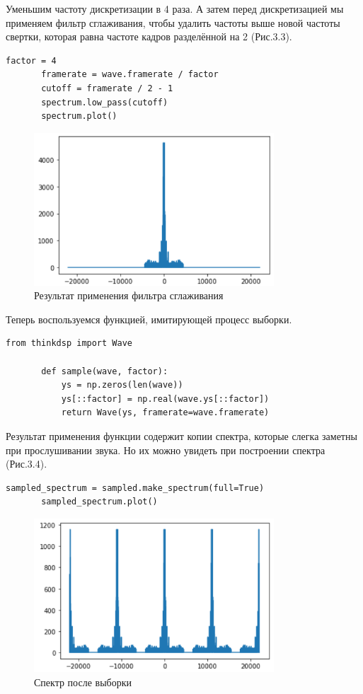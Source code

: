 \documentclass[a4paper,12pt]{report}
\begin{document}
    Уменьшим частоту дискретизации в 4 раза. А затем перед дискретизацией мы применяем фильтр сглаживания, чтобы удалить частоты выше новой частоты свертки, которая равна частоте кадров разделённой на 2 (Рис.3.3).
\begin{lstlisting}[caption=Применение фильтра сглаживания]
       factor = 4
       framerate = wave.framerate / factor
       cutoff = framerate / 2 - 1
       spectrum.low_pass(cutoff)
       spectrum.plot()
\end{lstlisting}
\begin{figure}[H]
        \centering
        \includegraphics[width=0.8\textwidth]{fig3-3.PNG}
        \caption{Результат применения фильтра сглаживания}
        \label{fig:fig3-3}
\end{figure}
    
    Теперь воспользуемся функцией, имитирующей процесс выборки.
\begin{lstlisting}[caption=Функция выборки]
       from thinkdsp import Wave

       def sample(wave, factor):
           ys = np.zeros(len(wave))
           ys[::factor] = np.real(wave.ys[::factor])
           return Wave(ys, framerate=wave.framerate)
\end{lstlisting}     
    
    Результат применения функции содержит копии спектра, которые слегка заметны при прослушивании звука. Но их можно увидеть при построении спектра (Рис.3.4).

\begin{lstlisting}[caption=Построение спектра]
       sampled_spectrum = sampled.make_spectrum(full=True)
       sampled_spectrum.plot()
\end{lstlisting}
\begin{figure}[H]
        \centering
        \includegraphics[width=0.8\textwidth]{fig3-4.PNG}
        \caption{Спектр после выборки}
        \label{fig:fig3-4}
\end{figure} 
    
\end{document}
